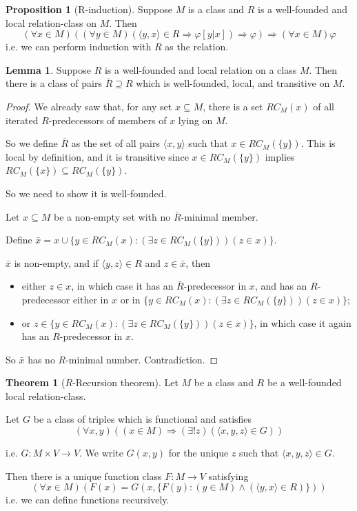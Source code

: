 \documentclass[a4paper]{article}
\theoremstyle{definition}
\newtheorem*{prop}{Proposition}
\newtheorem*{thm}{Theorem}
\newtheorem*{lemma}{Lemma}
\newcommand{\bra}{\langle}
\newcommand{\ket}{\rangle}
\begin{document}
\begin{prop}[R-induction]
  Suppose $M$ is a class and $R$ is a well-founded and local relation-class on $M$. Then
  \[
  (\forall x\in M)((\forall y\in M)(\bra y, x\ket \in R\Rightarrow \varphi[y|x])\Rightarrow \varphi)\Rightarrow (\forall x\in M)\varphi
  \]
  i.e. we can perform induction with $R$ as the relation.
\end{prop}

\begin{lemma}
  Suppose $R$ is a well-founded and local relation on a class $M$. Then there is a class of pairs $\bar R\supseteq R$ which is well-founded, local, and transitive on $M$.
\end{lemma}

\begin{proof}
  We already saw that, for any set $x\subseteq M$, there is a set $RC_M(x)$ of all iterated $R$-predecessors of members of $x$ lying on $M$.

  So we define $\bar R$ as the set of all pairs $\bra x, y\ket$ such that $x\in RC_M(\{y\})$. This is local by definition, and it is transitive since $x\in RC_M(\{y\})$ implies $RC_M(\{x\})\subseteq RC_M(\{y\})$.

So we need to show it is well-founded.

Let $x\subseteq M$ be a non-empty set with no $\bar R$-minimal member.

Define $\bar x = x\cup \{y\in RC_M(x): (\exists z\in RC_M(\{y\}))(z\in x)\}$.

$\bar x$ is non-empty, and if $\bra y, z\ket\in R$ and $z\in \bar x$, then
\begin{itemize}
\item either $z\in x$, in which case it has an $\bar R$-predecessor in $x$, and has an $R$-predecessor either in $x$ or in $\{y\in RC_M(x): (\exists z\in RC_M(\{y\}))(z\in x)\}$;
\item or $z\in \{y\in RC_M(x): (\exists z\in RC_M(\{y\}))(z\in x)\}$, in which case it again has an $R$-predecessor in $x$.
\end{itemize}
So $\bar x$ has no $R$-minimal number. Contradiction.
\end{proof}

\begin{thm}[$R$-Recursion theorem]
  Let $M$ be a class and $R$ be a well-founded local relation-class.

  Let $G$ be a class of triples which is functional and satisfies
  \[
  (\forall x, y)((x\in M)\Rightarrow (\exists! z)(\bra x, y, z\ket \in G))
  \]

  i.e. $G: M\times V\to V$. We write $G(x, y)$ for the unique $z$ such that $\bra x, y, z\ket \in G$.

  Then there is a unique function class $F: M\to V$ satisfying
  \[
  (\forall x\in M)(F(x) = G(x, \{F(y): (y\in M)\wedge (\bra y, x\ket \in R)\}))
  \]
  i.e. we can define functions recursively. 
\end{thm}
\end{document}
